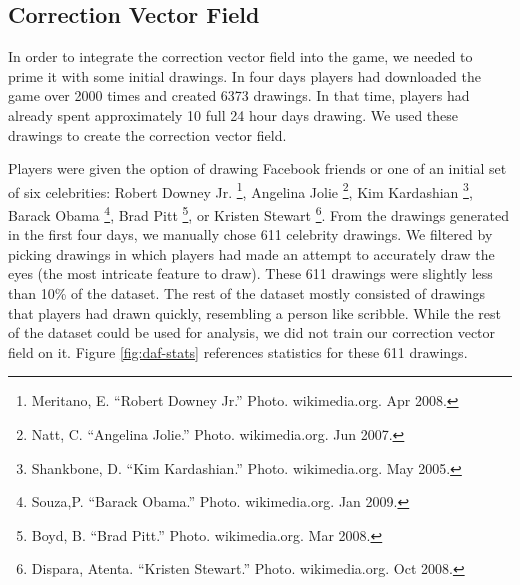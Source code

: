 \subsection{\daf Correction Vector Field}
In order to integrate the correction vector field into the game, we needed to prime it with some initial drawings. In four days players had downloaded the game over 2000 times and created 6373 drawings. In that time, players had already spent approximately 10 full 24 hour days drawing. We used these drawings to create the correction vector field.


Players were given the option of drawing Facebook friends or one of an initial set of six celebrities: Robert Downey Jr. \footnote{Meritano, E. ``Robert Downey Jr.'' Photo. wikimedia.org. Apr 2008.}, Angelina Jolie \footnote{Natt, C. ``Angelina Jolie.'' Photo. wikimedia.org. Jun 2007.}, Kim Kardashian \footnote{Shankbone, D. ``Kim Kardashian.'' Photo. wikimedia.org. May 2005.}, Barack Obama \footnote{Souza,P. ``Barack Obama.'' Photo. wikimedia.org. Jan 2009.}, Brad Pitt \footnote{Boyd, B. ``Brad Pitt.'' Photo. wikimedia.org. Mar 2008.}, or Kristen Stewart \footnote{Dispara, Atenta. ``Kristen Stewart.'' Photo. wikimedia.org. Oct 2008.}. From the drawings generated in the first four days, we manually chose 611 celebrity drawings. We filtered by picking drawings in which players had made an attempt to accurately draw the eyes (the most intricate feature to draw). These 611 drawings were slightly less than 10\% of the dataset. The rest of the dataset mostly consisted of drawings that players had drawn quickly, resembling a person like scribble. While the rest of the dataset could be used for analysis, we did not train our correction vector field on it.  Figure \ref{fig:daf-stats} references statistics for these 611 drawings.

